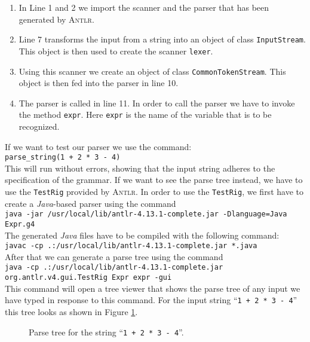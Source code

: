 \begin{enumerate}
\item In Line 1 and 2 we import the scanner and the parser that has been generated by \textsc{Antlr}.
\item Line 7 transforms the input from a string into an object of class \texttt{InputStream}.
      This object is then used to create the scanner \texttt{lexer}.
\item Using this scanner we create an object of class \texttt{CommonTokenStream}.
      This object is then fed into the parser in line 10.
\item The parser is called in line 11.  In order to call the parser we have to invoke the method 
      \texttt{expr}.  Here \texttt{expr} is the name of the variable that is to be recognized.
\end{enumerate}
If we want to test our parser we use the command:
\\[0.2cm]
\hspace*{1.3cm}
\texttt{parse\_string(1 + 2 * 3 - 4)}
\\[0.2cm]
This will run without errors, showing that the input string adheres to the specification of the grammar.
If we want to see the parse tree instead, we have to use the \texttt{TestRig} provided by \textsc{Antlr}.
In order to use the \texttt{TestRig}, we first have to create a \textsl{Java}-based parser using the command
\\[0.2cm]
\hspace*{1.3cm}
\texttt{java -jar /usr/local/lib/antlr-4.13.1-complete.jar -Dlanguage=Java Expr.g4}
\\[0.2cm]
The generated \textsl{Java} files have to be compiled with the following command:
\\[0.2cm]
\hspace*{1.3cm}
\texttt{javac -cp .:/usr/local/lib/antlr-4.13.1-complete.jar *.java}
\\[0.2cm]
After that we can generate a parse tree using the command
\\[0.2cm]
\hspace*{-0.1cm}
\texttt{java -cp .:/usr/local/lib/antlr-4.13.1-complete.jar org.antlr.v4.gui.TestRig Expr expr -gui}
\\[0.2cm]
This command will open a tree viewer that shows the parse tree of any input we have typed in response to this command.
For the input string ``\texttt{1 + 2 * 3 - 4}''  this tree looks as shown in Figure \ref{fig:parse-tree.pdf}.

\begin{figure}[!ht]
  \centering
   \caption{Parse tree for the string ``\texttt{1 + 2 * 3 - 4}''.}
  \label{fig:parse-tree.pdf}
\end{figure}



